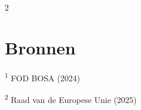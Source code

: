 \documentclass[a0,portrait]{hogent-poster}
\begin{document}
\begin{multicols}{2}
\section{Bronnen}

\small

\textsuperscript{1} FOD BOSA (2024)

\textsuperscript{2} Raad van de Europese Unie (2025)

\end{multicols}
\end{document}
